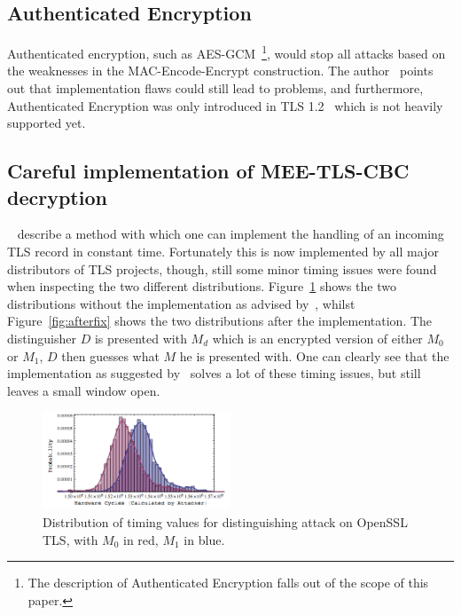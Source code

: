 \documentclass[10pt,conference,a4paper]{IEEEtran}
\begin{document}
\subsection{Authenticated Encryption}
\label{sec:future:ae}
Authenticated encryption, such as AES-GCM~\cite{salowey2008aes}\footnote{The description of Authenticated Encryption falls out of the scope of this paper.}, would stop all attacks based on the weaknesses in the MAC-Encode-Encrypt construction. The author~\cite{alfardan2013lucky} points out that implementation flaws could still lead to problems, and furthermore, Authenticated Encryption was only introduced in TLS 1.2~\cite{ietf2008transport} which is not heavily supported yet.

\subsection{Careful implementation of MEE-TLS-CBC decryption}
\label{sec:future:implementation}
~\citeauthor{alfardan2013lucky} describe a method with which one can implement the handling of an incoming TLS record in constant time. Fortunately this is now implemented by all major distributors of TLS projects, though, still some minor timing issues were found when inspecting the two different distributions. Figure~\ref{fig:beforefix} shows the two distributions without the implementation as advised by~\citeauthor{alfardan2013lucky}, whilst Figure~\ref{fig:afterfix} shows the two distributions after the implementation. The distinguisher $D$ is presented with $M_d$ which is an encrypted version of either $M_0$ or $M_1$, $D$ then guesses what $M$ he is presented with. One can clearly see that the implementation as suggested by~\citeauthor{alfardan2013lucky} solves a lot of these timing issues, but still leaves a small window open.

\begin{figure}[h]
	\centering
	\includegraphics[width=0.5\textwidth]{beforefix.png}
	\caption{Distribution of timing values for distinguishing attack on OpenSSL TLS, with $M_0$ in red, $M_1$ in blue.~\cite{alfardan2013lucky}}
	\label{fig:beforefix}
\end{figure}
\end{document}

